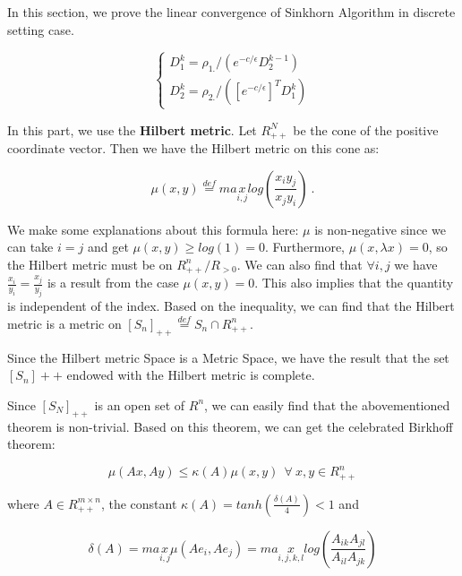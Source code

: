 In this section, we prove the linear convergence of Sinkhorn Algorithm in discrete setting case.

\begin{equation}
\left\{
\begin{array}{lr}
D_1^k = \rho_{1.}/(e^{-c/\epsilon}D^{k-1}_2)\\
D_2^k = \rho_{2.}/([e^{-c/\epsilon}]^{T}D_1^k)
\end{array}
\right.
\end{equation}

In this part, we use the \textbf{Hilbert metric}. Let $R^N_{++}$ be the cone of the positive coordinate vector. Then we have the Hilbert metric on this cone as:

\begin{equation}
    \mu(x,y)  \overset{def}{=}  max\limits_{i,j}log(\frac{x_i y_j}{x_j y_i}) \ .
\end{equation}

We make some explanations about this formula here: $\mu$ is non-negative since we can take $i=j$ and get $\mu(x,y)\geq log(1) = 0$. Furthermore, $\mu(x,\lambda x)=0$, so the Hilbert metric must be on $R^n_{++}/R_{>0}$. 
We can also find that $\forall i,j $ we have $\frac{x_i}{y_i} = \frac{x_j}{y_j}$ is a result from the case $\mu(x,y)=0$.
This also implies that the quantity is independent of the index.
Based on the inequality, we can find that the Hilbert metric is a metric on $[S_n]_{++} \overset{def}{=} S_n \cap R_{++}^{n}$. 

Since the Hilbert metric Space is a Metric Space, we have the result that the set $[S_n]++$ endowed with the Hilbert metric is complete.

Since $[S_N]_{++}$ is an open set of $R^n$, we can easily find that the abovementioned theorem is non-trivial. Based on this theorem, we can get the celebrated Birkhoff theorem:

\begin{equation}
    \mu(Ax, Ay) \leq \kappa(A) \mu(x,y) \: \: \forall \: x,y \in R_{++}^n 
\end{equation}

where $A\in R_{++}^{m\times n}$, the constant $\kappa(A)=tanh(\frac{\delta(A)}{4})<1$ and 

\begin{equation}
    \delta(A) = max\limits_{i,j} \mu(Ae_i, Ae_j) = max\limits_{i,j,k,l} log(\frac{A_{ik}A_{jl}}{A_{il}A_{jk}})
\end{equation}

